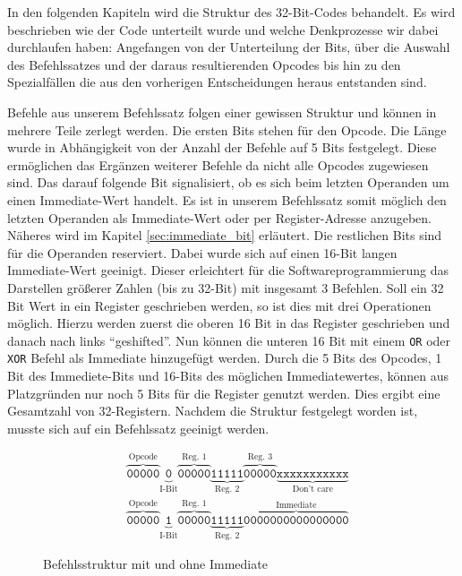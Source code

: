 \documentclass[paper=a4,fontsize=11pt,twocolumn]{scrreprt}
\begin{document}
In den folgenden Kapiteln wird die Struktur des 32-Bit-Codes behandelt.
Es wird beschrieben wie der Code unterteilt wurde und welche Denkprozesse wir dabei durchlaufen haben:
Angefangen von der Unterteilung der Bits, über die Auswahl des Befehlssatzes und der daraus resultierenden Opcodes bis hin zu den Spezialfällen die aus den vorherigen Entscheidungen heraus entstanden sind.

Befehle aus unserem Befehlssatz folgen einer gewissen Struktur und können in mehrere Teile zerlegt werden.
Die ersten Bits stehen für den Opcode.
Die Länge wurde in Abhängigkeit von der Anzahl der Befehle auf 5 Bits festgelegt.
Diese ermöglichen das Ergänzen weiterer Befehle da nicht alle Opcodes zugewiesen sind.
Das darauf folgende Bit signalisiert, ob es sich beim letzten Operanden um einen Immediate-Wert handelt.
Es ist in unserem Befehlssatz somit möglich den letzten Operanden als Immediate-Wert oder per Register-Adresse anzugeben.
Näheres wird im Kapitel \ref{sec:immediate_bit} erläutert.
Die restlichen Bits sind für die Operanden reserviert.
Dabei wurde sich auf einen 16-Bit langen Immediate-Wert geeinigt.
Dieser erleichtert für die Softwareprogrammierung das Darstellen größerer Zahlen (bis zu 32-Bit) mit insgesamt 3 Befehlen.
Soll ein 32 Bit Wert in ein Register geschrieben werden, so ist dies mit drei Operationen möglich.
Hierzu werden zuerst die oberen 16 Bit in das Register geschrieben und danach nach links \enquote{geshifted}. Nun können die unteren 16 Bit mit einem \texttt{OR} oder \texttt{XOR} Befehl als Immediate hinzugefügt werden.
Durch die 5 Bits des Opcodes, 1 Bit des Immediete-Bits und 16-Bits des möglichen Immediatewertes, können aus Platzgründen nur noch 5 Bits für die Register genutzt werden.
Dies ergibt eine Gesamtzahl von 32-Registern.
Nachdem die Struktur festgelegt worden ist, musste sich auf ein Befehlssatz geeinigt werden.

\begin{figure*}[t]
    \centering
    \begin{align*}
        &\overbrace{\texttt{00000}}^\text{Opcode}
        \underbrace{\texttt{0}}_\text{I-Bit}
        \overbrace{\texttt{00000}}^\text{Reg. 1}
        \underbrace{\texttt{11111}}_\text{Reg. 2}
        \overbrace{\texttt{00000}}^\text{Reg. 3}
        \underbrace{\texttt{xxxxxxxxxxx}}_\text{Don't care}\\ 
        &\overbrace{\texttt{00000}}^\text{Opcode}
        \underbrace{\texttt{1}}_\text{I-Bit}
        \overbrace{\texttt{00000}}^\text{Reg. 1}
        \underbrace{\texttt{11111}}_\text{Reg. 2}
        \overbrace{\texttt{0000000000000000}}^\text{Immediate}
    \end{align*}
    \caption{Befehlsstruktur mit und ohne Immediate}
    \label{fig:Befehlsstruktur}
\end{figure*}
\end{document}
